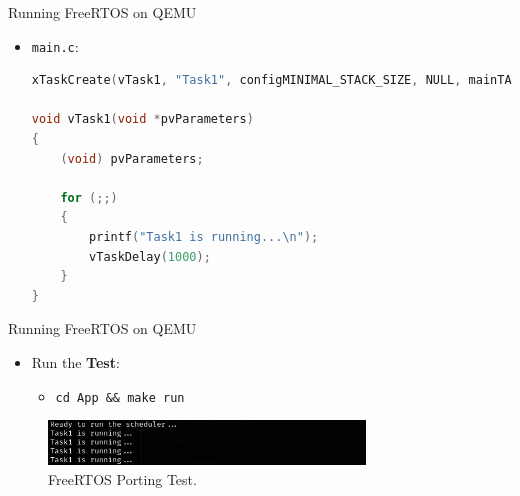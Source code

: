 %     
%     
% 

\begin{frame}[fragile]{Running FreeRTOS on QEMU}
    \begin{itemize}
        \item \texttt{main.c}:
            \begin{lstlisting}[language=C]
xTaskCreate(vTask1, "Task1", configMINIMAL_STACK_SIZE, NULL, mainTASK_PRIORITY, NULL);

void vTask1(void *pvParameters) 
{
    (void) pvParameters;

    for (;;) 
    {
        printf("Task1 is running...\n");
        vTaskDelay(1000);
    }
}
            \end{lstlisting}
    \end{itemize}
\end{frame}

\begin{frame}[fragile]{Running FreeRTOS on QEMU}
    \begin{itemize}
        \item Run the \textbf{Test}:
            \begin{itemize}
                \item \texttt{cd App \&\& make run}
            \end{itemize}
    \end{itemize}
    \begin{figure}[h]
        \centering
        \includegraphics[width=0.75\textwidth]{images/freertos_porting.png}
        \caption{FreeRTOS Porting Test.}
    \end{figure}
\end{frame}
